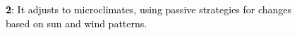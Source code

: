 ﻿%
\begin{figure}[H]
	\centering
	
	\vspace*{\baselineskip}%
	\caption*{%
		\footnotesize
		\textcolor{black}{%
			\textnormal{%
				\textbf{2}:
				It adjusts to microclimates, using passive strategies for changes based on sun and wind patterns.
			}
		}
	}
	\label{
		fig:algae-bio-facade-system--features-02
	}
\end{figure}
